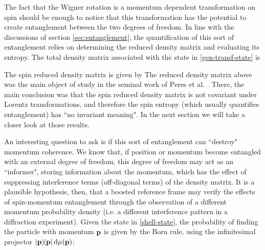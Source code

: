 \documentclass[12pt,a4paper,notitlepage]{report}
\begin{document}
The fact that the Wigner rotation is a momentum dependent transformation on spin should be enough to notice that this transformation has the potential to create entanglement between the two degrees of freedom. In line with the discussions of section \ref{sec:entanglement}, the quantification of this sort of entanglement relies on determining the reduced density matrix and evaluating its entropy. The total density matrix associated with the state in \eqref{gen-transf-state} is

%
The spin reduced density matrix is given by
%
The reduced density matrix above was the main object of study in the seminal work of Peres et al. \cite{peres2002}. There, the main conclusion was that the spin reduced density matrix is not covariant under Lorentz transformations, and therefore the spin entropy (which usually quantifies entanglement) has ``no invariant meaning". In the next section we will take a closer look at those results.


An interesting question to ask is if this sort of entanglement can ``destroy" momentum coherence. We know that, if position or momentum become entangled with an external degree of freedom, this degree of freedom may act as an ``informer", storing information about the momentum, which has the effect of suppressing interference terms (off-diagonal terms) of the density matrix. It is a plausible hypothesis, then, that a boosted reference frame may verify the effects of spin-momentum entanglement through the observation of a different momentum probability density (i.e. a different interference pattern in a diffraction experiment). Given the state in \eqref{shell-state}, the probability of finding the particle with momentum $\vb{p}$ is given by the Born rule, using the infinitesimal projector $\dyad{\vb{p}}\dd{\mu(\vb{p})}$:
\end{document}
